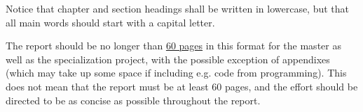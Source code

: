 \documentclass[thesis.tex]{subfiles}
\begin{document}
\begin{remark}
Notice that chapter and section headings shall be written in lowercase, but that all main words should start with a capital letter.
\end{remark}



The report should be no longer than \underline{60 pages} in this format for the master as well as the specialization project, with the possible exception of appendixes (which may take up some space if including e.g. code from programming). 
This does not mean that the report must be at least 60 pages, and the effort should be directed to be as concise as possible throughout the report.

\blankpage
\end{document}
